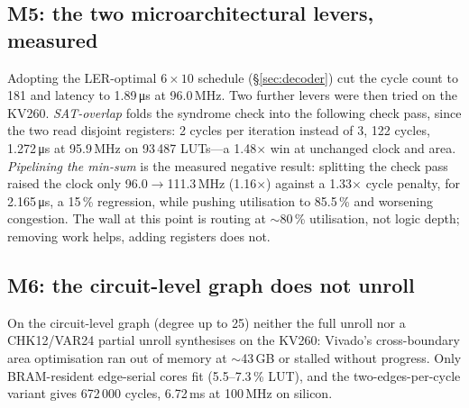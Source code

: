 \subsection*{M5: the two microarchitectural levers, measured}
Adopting the LER-optimal $6\times 10$ schedule (\S\ref{sec:decoder}) cut
the cycle count to 181 and latency to 1.89\,\si{\micro\second} at
96.0\,MHz.
Two further levers were then tried on the KV260. \emph{SAT-overlap}
folds the syndrome check into the following check pass, since the two read
disjoint registers: 2 cycles per iteration instead of 3, 122 cycles,
1.272\,\si{\micro\second} at 95.9\,MHz on 93\,487 LUTs---a 1.48$\times$
win at unchanged clock and area.
\emph{Pipelining the min-sum} is the measured negative result: splitting
the check pass raised the clock only 96.0$\to$111.3\,MHz (1.16$\times$)
against a 1.33$\times$ cycle penalty, for 2.165\,\si{\micro\second}, a 15\,\%
regression, while pushing utilisation to 85.5\,\% and worsening congestion.
The wall at this point is routing at $\sim$80\,\% utilisation, not logic
depth; removing work helps, adding registers does not.

\subsection*{M6: the circuit-level graph does not unroll}
On the circuit-level graph (degree up to 25) neither the full unroll nor a
CHK12/VAR24 partial unroll synthesises on the KV260: Vivado's
cross-boundary area optimisation ran out of memory at $\sim$43\,GB or stalled
without progress. Only BRAM-resident edge-serial cores fit (5.5--7.3\,\%
LUT), and the two-edges-per-cycle variant gives 672\,000 cycles,
6.72\,ms at 100\,MHz on silicon.

